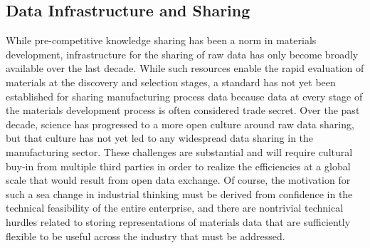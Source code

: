 

\subsection{Data Infrastructure and Sharing}
While pre-competitive knowledge sharing has been a norm in materials development, infrastructure for the sharing of raw data has only become broadly available over the last decade\cite{CitrineInformatics,MP}. 
While such resources enable the rapid evaluation of materials at the discovery and selection stages, a standard has not yet been established for sharing manufacturing process data because data at every stage of the materials development process is often considered trade secret\cite{TheMinerals2013}. 
Over the past decade, science has progressed to a more open culture around raw data sharing, but that culture has not yet led to any widespread data sharing in the manufacturing sector.
These challenges are substantial and will require cultural buy-in from multiple third parties in order to realize the efficiencies at a global scale that would result from open data exchange. 
Of course, the motivation for such a sea change in industrial thinking must be derived from confidence in the technical feasibility of the entire enterprise, and there are nontrivial technical hurdles related to storing representations of materials data that are sufficiently flexible to be useful across the industry that must be addressed. 

